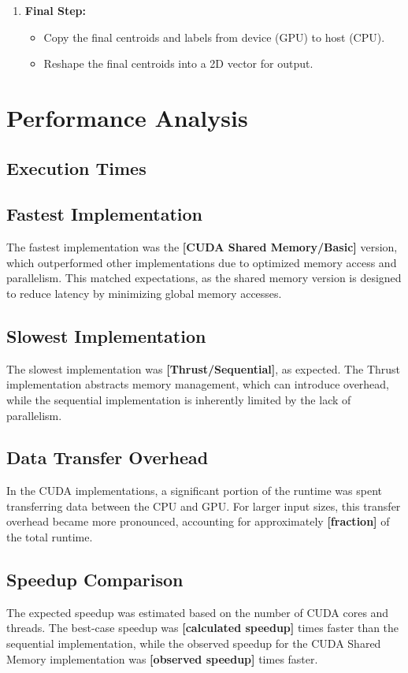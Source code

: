 \documentclass[letterpaper,12pt]{article}
\theoremstyle{remark}
\begin{document}
\begin{enumerate}
    \item \textbf{Final Step:}
    \begin{itemize}
        \item Copy the final centroids and labels from device (GPU) to host (CPU).
        \item Reshape the final centroids into a 2D vector for output.
    \end{itemize}
\end{enumerate}




\section{Performance Analysis}

\subsection{Execution Times}


\subsection{Fastest Implementation}
The fastest implementation was the \textbf{[CUDA Shared Memory/Basic]} version, which outperformed other implementations due to optimized memory access and parallelism. This matched expectations, as the shared memory version is designed to reduce latency by minimizing global memory accesses.

\subsection{Slowest Implementation}
The slowest implementation was \textbf{[Thrust/Sequential]}, as expected. The Thrust implementation abstracts memory management, which can introduce overhead, while the sequential implementation is inherently limited by the lack of parallelism.

\subsection{Data Transfer Overhead}
In the CUDA implementations, a significant portion of the runtime was spent transferring data between the CPU and GPU. For larger input sizes, this transfer overhead became more pronounced, accounting for approximately \textbf{[fraction]} of the total runtime.

\subsection{Speedup Comparison}
The expected speedup was estimated based on the number of CUDA cores and threads. The best-case speedup was \textbf{[calculated speedup]} times faster than the sequential implementation, while the observed speedup for the CUDA Shared Memory implementation was \textbf{[observed speedup]} times faster.
\end{document}
